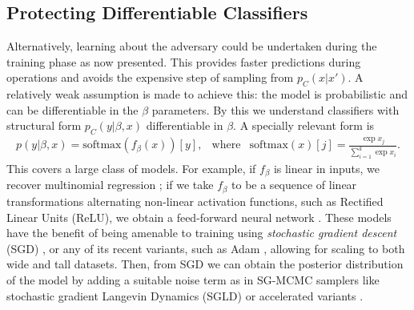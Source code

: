  
 
 \subsection{Protecting Differentiable Classifiers}\label{sec:uncs}
 
Alternatively, learning about the adversary 
could be undertaken during the training phase as now 
presented. This provides faster predictions during operations and avoids the expensive step of sampling from $p_C(x \vert x')$.
A relatively weak assumption is made to achieve this: 
the model is probabilistic and can be differentiable in the $\beta$ parameters.
By this we understand classifiers with structural form 
$p_C(y|\beta,x)$ differentiable in $\beta$. 
A specially relevant form %
is 
%
\begin{eqnarray}\label{TGF}
p(y|\beta, x) = \mbox{softmax} (f_\beta (x))[y], & \text{where} & \mbox{softmax}(x)[j] = \frac{\exp{x_j}}{\sum_{i=1}^k \exp{x_i} }. 
\end{eqnarray}
%
This covers a large class of models. For example,
if $f_\beta$ is linear in inputs, %
we recover multinomial regression 
\parencite{mccullagh1989generalized}; if we take $f_\beta$ to be a sequence of linear transformations alternating non-linear activation functions, such as Rectified Linear Units (ReLU), we obtain a feed-forward neural network \parencite{10.5555/3086952}. 
These models have the benefit of being amenable to training using \emph{stochastic gradient descent} (SGD) \parencite{bottou2010large},
or any of its recent variants, such as Adam \parencite{kingma2014adam}, 
allowing for scaling to both wide and tall datasets. Then, from SGD we can obtain the posterior distribution of the model by adding a suitable noise term as in SG-MCMC samplers like stochastic gradient Langevin Dynamics (SGLD) \parencite{welling2011bayesian} or accelerated variants \parencite{ma2015complete}.

